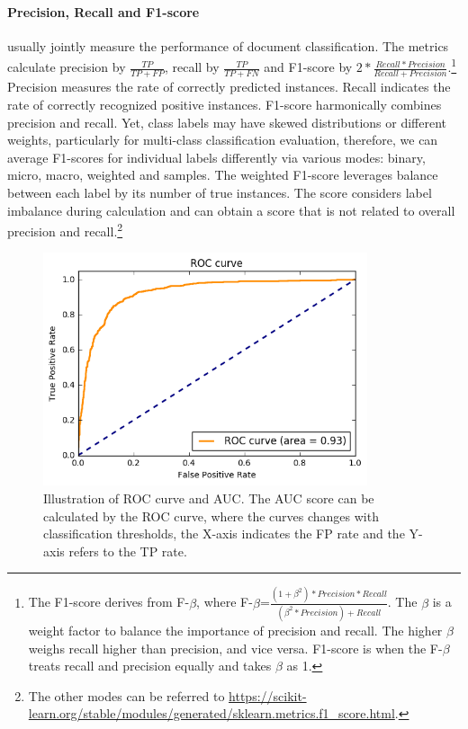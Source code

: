 \paragraph{Precision, Recall and F1-score} usually jointly measure the performance of document classification. The metrics calculate precision by $\frac{TP}{TP+FP}$, recall by $\frac{TP}{TP+FN}$ and F1-score by $2*\frac{Recall*Precision}{Recall+Precision}$.\footnote{The F1-score derives from F-$\beta$, where F-$\beta$=$\frac{(1+\beta^2)*Precision*Recall}{(\beta^2*Precision)+Recall}$. The $\beta$ is a weight factor to balance the importance of precision and recall. 
The higher $\beta$ weighs recall higher than precision, and vice versa. 
F1-score is when the F-$\beta$ treats recall and precision equally and takes $\beta$ as 1.}
Precision measures the rate of correctly predicted instances. 
Recall indicates the rate of correctly recognized positive instances. 
F1-score harmonically combines precision and recall.
Yet, class labels may have skewed distributions or different weights, particularly for multi-class classification evaluation, therefore, we can average F1-scores for individual labels differently via various modes: binary, micro, macro, weighted and samples.
The weighted F1-score leverages balance between each label by its number of true instances.
The score considers label imbalance during calculation and can obtain a score that is not related to overall precision and recall.\footnote{The other modes can be referred to \url{https://scikit-learn.org/stable/modules/generated/sklearn.metrics.f1_score.html}.}


\begin{figure}[tb!]
\centering
\includegraphics[width=0.85\textwidth]{images/chapter2/roc-curve.png}
\caption{Illustration of ROC curve and AUC. The AUC score can be calculated by the ROC curve, where the curves changes with classification thresholds, the X-axis indicates the FP rate and the Y-axis refers to the TP rate.}
\label{chap2:fig:roc}
\end{figure}

